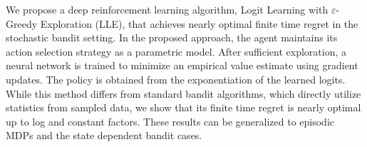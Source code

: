 We propose a deep reinforcement learning algorithm, Logit Learning with $\varepsilon$-Greedy Exploration (LLE), that achieves nearly optimal finite time regret in the stochastic bandit setting. In the proposed approach, the agent maintains its action selection strategy as a parametric model. After sufficient exploration, a neural network is trained to minimize an empirical value estimate using gradient updates. The policy is obtained from the exponentiation of the learned logits. While this method differs from standard bandit algorithms, which directly utilize statistics from sampled data, we show that its finite time regret is nearly optimal up to log and constant factors. These results can be generalized to episodic MDPs and the state dependent bandit cases.